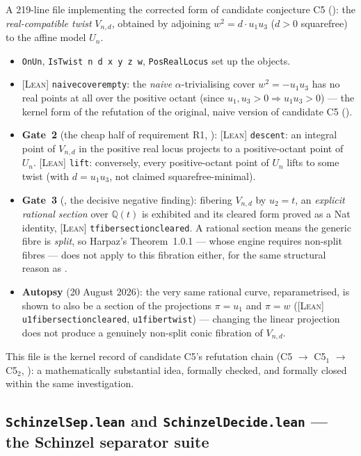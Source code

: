\documentclass[11pt]{article}
\theoremstyle{plain}
\theoremstyle{definition}
\theoremstyle{remark}
\newcommand{\LEAN}{\textcolor{proved}{\textsc{[Lean]}}}
\newcommand{\file}[1]{\texttt{#1}}
\newcommand{\lean}[1]{\texttt{#1}}
\renewcommand{\_}{\textunderscore\allowbreak}
\newcommand{\Q}{\mathbb{Q}}
\begin{document}
A 219-line file implementing the corrected form of candidate conjecture C5 ():
the \emph{real-compatible twist} $V_{n,d}$, obtained by adjoining $w^2=d\cdot u_1u_3$ ($d>0$
squarefree) to the affine model $U_n$.
\begin{itemize}[leftmargin=1.4em]
  \item \lean{OnUn}, \lean{IsTwist n d x y z w}, \lean{PosRealLocus} set up the objects.
  \item \LEAN{} \lean{naive\_cover\_empty}: the \emph{naive} $\alpha$-trivialising cover
        $w^2=-u_1u_3$ has no real points at all over the positive octant (since
        $u_1,u_3>0\Rightarrow u_1u_3>0$) — the kernel form of the refutation of the original,
        naive version of candidate C5 ().
  \item \textbf{Gate~2} (the cheap half of requirement R1, ): \LEAN{}
        \lean{descent}: an integral point of $V_{n,d}$ in the positive real locus projects to a
        positive-octant point of $U_n$. \LEAN{} \lean{lift}: conversely, every positive-octant
        point of $U_n$ lifts to some twist (with $d=u_1u_3$, not claimed squarefree-minimal).
  \item \textbf{Gate~3} (, the decisive negative finding): fibering $V_{n,d}$ by
        $u_2=t$, an \emph{explicit rational section} over $\Q(t)$ is exhibited and its cleared
        form proved as a Nat identity, \LEAN{} \lean{t\_fiber\_section\_cleared}. A rational
        section means the generic fibre is \emph{split}, so Harpaz's Theorem~1.0.1 — whose
        engine requires non-split fibres — does not apply to this fibration either, for the
        same structural reason as .
  \item \textbf{Autopsy} (20 August 2026): the very same rational curve, reparametrised, is
        shown to also be a section of the projections $\pi=u_1$ and $\pi=w$
        (\LEAN{} \lean{u1\_fiber\_section\_cleared}, \lean{u1\_fiber\_twist}) — changing the
        linear projection does not produce a genuinely non-split conic fibration of $V_{n,d}$.
\end{itemize}
This file is the kernel record of candidate C5's refutation chain (C5 $\to$ C5$_1$ $\to$
C5$_2$, ): a mathematically substantial idea, formally checked, and formally
closed within the same investigation.

\subsection{\file{SchinzelSep.lean} and \file{SchinzelDecide.lean} — the Schinzel separator suite}
\label{subsec:schinzel-lean}
\end{document}
